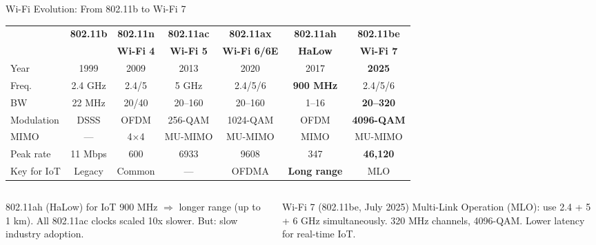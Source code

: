 \documentclass[aspectratio=169,11pt]{beamer}
\begin{document}
\begin{frame}{Wi-Fi Evolution: From 802.11b to Wi-Fi 7}
    \footnotesize
    \begin{center}
    \begin{tabular}{lcccccc}
        \toprule
        & \textbf{802.11b} & \textbf{802.11n} & \textbf{802.11ac} & \textbf{802.11ax} & \textbf{802.11ah} & \textbf{802.11be} \\
        & & \textbf{Wi-Fi 4} & \textbf{Wi-Fi 5} & \textbf{Wi-Fi 6/6E} & \textbf{HaLow} & \textbf{Wi-Fi 7} \\
        \midrule
        Year & 1999 & 2009 & 2013 & 2020 & 2017 & \textbf{2025} \\
        Freq. & 2.4 GHz & 2.4/5 & 5 GHz & 2.4/5/6 & \textbf{900 MHz} & 2.4/5/6 \\
        BW & 22 MHz & 20/40 & 20--160 & 20--160 & 1--16 & \textbf{20--320} \\
        Modulation & DSSS & OFDM & 256-QAM & 1024-QAM & OFDM & \textbf{4096-QAM} \\
        MIMO & --- & 4$\times$4 & MU-MIMO & MU-MIMO & MIMO & MU-MIMO \\
        Peak rate & 11 Mbps & 600 & 6933 & 9608 & 347 & \textbf{46,120} \\
        Key for IoT & Legacy & Common & --- & OFDMA & \textbf{Long range} & MLO \\
        \bottomrule
    \end{tabular}
    \end{center}
    \normalsize
    
    \vspace{0.2cm}
    \begin{columns}
        \begin{exampleblock}{802.11ah (HaLow) for IoT}
            900 MHz $\Rightarrow$ longer range (up to 1 km).
            All 802.11ac clocks scaled 10x slower.
            But: slow industry adoption.
        \end{exampleblock}
        
        \begin{alertblock}{Wi-Fi 7 (802.11be, July 2025)}
            Multi-Link Operation (MLO): use 2.4 + 5 + 6 GHz simultaneously.
            320 MHz channels, 4096-QAM.
            Lower latency for real-time IoT.
        \end{alertblock}
    \end{columns}
\end{frame}
\end{document}
